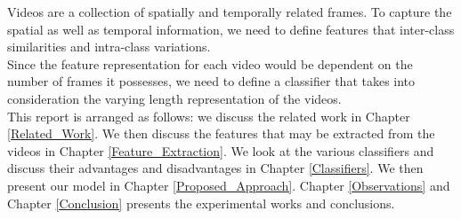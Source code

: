 Videos are a collection of spatially and temporally related frames. To capture the spatial as well as temporal information, we need to define features that inter-class similarities and intra-class variations.\\

Since the feature representation for each video would be dependent on the number of frames it possesses, we need to define a classifier that takes into consideration the varying length representation of the videos.\\

This report is arranged as follows: we discuss the related work in Chapter \ref{Related_Work}. We then discuss the features that may be extracted from the videos in Chapter \ref{Feature_Extraction}. We look at the various classifiers and discuss their advantages and disadvantages in Chapter \ref{Classifiers}. We then present our model in Chapter \ref{Proposed_Approach}. Chapter \ref{Observations} and Chapter \ref{Conclusion} presents the experimental works and conclusions.